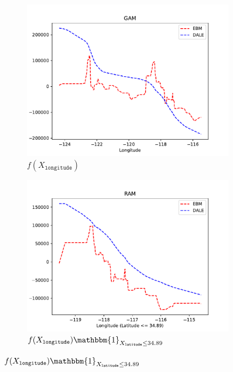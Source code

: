 \documentclass[12pt]{article}
\newcommand{\when}[1]{\mathbbm{1}_{#1}}
\begin{document}
\begin{figure}[htbp]
    \centering
    \begin{subfigure}{0.32\textwidth}
        \centering
        \includegraphics[width=\textwidth]{figures/california_gam}
        \caption{\(f(X_{\mathtt{longitude}})\)}
        \label{subfig:california_gam}
    \end{subfigure}
    \begin{subfigure}{0.32\textwidth}
        \centering
        \includegraphics[width=\textwidth]{figures/california_ram_1}
        \caption{\(f(X_{\mathtt{longitude}}) \when{X_{\mathtt{latitude}} \leq 34.89}\)}
        \label{subfig:california_ram_1}
    \end{subfigure}

\end{figure}
\end{document}
